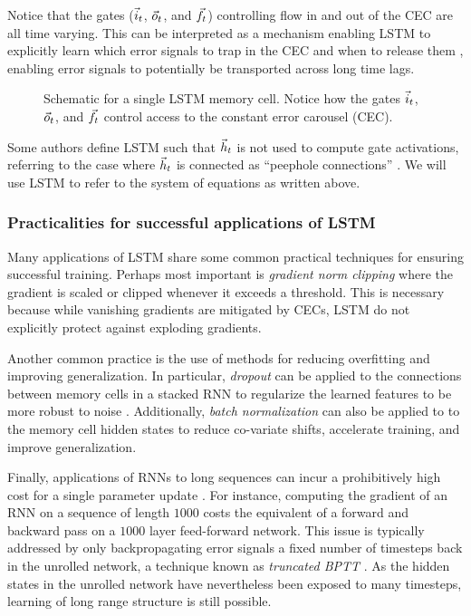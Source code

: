 Notice that the gates ($\vec{i}_t$, $\vec{o}_t$, and $\vec{f}_t$) controlling flow in and out
of the CEC are all time varying. This can be interpreted as a mechanism
enabling LSTM to explicitly learn which error signals to trap in the CEC and
when to release them \citep{hochreiter1997long}, enabling error signals to
potentially be transported across long time lags.

\begin{figure}[tb]
    \centering
    
    \caption{Schematic for a single LSTM memory cell. Notice how the gates $\vec{i}_t$, $\vec{o}_t$, and $\vec{f}_t$ control access to the constant error carousel (CEC).}
    \label{fig:lstm-cell}
\end{figure}

Some authors define LSTM such that $\vec{h}_t$ is not used to compute gate
activations, referring to the case where $\vec{h}_t$ is connected as ``peephole
connections'' \citep{gers2000recurrent}. We will use LSTM to refer to the
system of equations as written above.

\subsubsection{Practicalities for successful applications of LSTM}

Many applications of LSTM
\citep{devlin2014fast,zaremba2015empirical,pascanu2013construct} share some
common practical techniques for ensuring successful training. Perhaps most
important is \emph{gradient norm clipping} \citep{Mikolov2012,Pascanu2012}
where the gradient is scaled or clipped whenever it exceeds a threshold. This
is necessary because while vanishing gradients are mitigated by CECs, LSTM do
not explicitly protect against exploding gradients.

Another common practice is the use of methods for reducing overfitting and
improving generalization. In particular, \emph{dropout}
\citep{srivastava2014dropout} can be applied to the connections between memory
cells in a stacked RNN to regularize the learned features to be more robust to
noise \citep{zaremba2014recurrent}. Additionally, \emph{batch normalization}
\citep{ioffe2015batch} can also be applied to to the memory cell hidden states
to reduce co-variate shifts, accelerate training, and improve generalization.

Finally, applications of RNNs to long sequences can incur a prohibitively high
cost for a single parameter update \citep{citeulike:13881859}. For instance,
computing the gradient of an RNN on a sequence of length $1000$ costs the
equivalent of a forward and backward pass on a $1000$ layer feed-forward
network. This issue is typically addressed by only backpropagating error
signals a fixed number of timesteps back in the unrolled network, a technique
known as \emph{truncated BPTT} \citep{williams1990efficient}. As the hidden
states in the unrolled network have nevertheless been exposed to many
timesteps, learning of long range structure is still possible.


